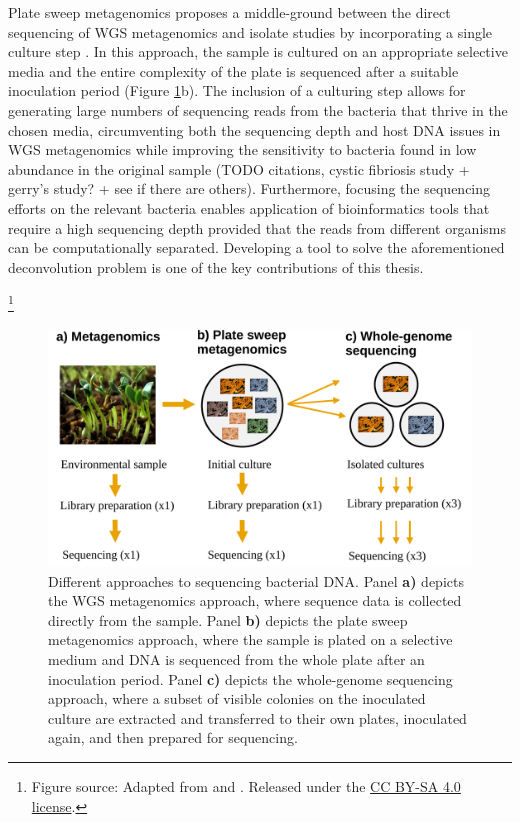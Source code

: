 \documentclass[officiallayout]{tktla}
\let\svthefootnote\thefootnote
\begin{document}
Plate sweep metagenomics proposes a middle-ground between the direct
sequencing of WGS metagenomics and isolate studies by incorporating a
single culture step \citep{maklin_high-resolution_2021}. In this
approach, the sample is cultured on an appropriate selective media and
the entire complexity of the plate is sequenced after a suitable
inoculation period (Figure
\ref{fig:microbiome-sampling-methods}b). The inclusion of a culturing
step allows for generating large numbers of sequencing reads from the
bacteria that thrive in the chosen media, circumventing both the
sequencing depth and host DNA issues in WGS metagenomics while
improving the sensitivity to bacteria found in low abundance in the
original sample (TODO citations, cystic fibriosis study + gerry's
study? + see if there are others). Furthermore, focusing the
sequencing efforts on the relevant bacteria enables application of
bioinformatics tools that require a high sequencing depth provided
that the reads from different organisms can be computationally
separated. Developing a tool to solve the aforementioned deconvolution
problem is one of the key contributions of this thesis.

\noindent\let\thefootnote\relax\footnote{Figure source: Adapted from \cite{praveera_fenugreek-sprouts} and \cite{niaid_escherichia-coli}. Released under the \href{https://creativecommons.org/licenses/by-sa/4.0}{CC BY-SA 4.0 license}.}
\addtocounter{footnote}{-1}\let\thefootnote\svthefootnote
\begin{figure}[!ht]
  \label{fig:microbiome-sampling-methods}
    \centering
    \includegraphics[width=\textwidth,keepaspectratio]{img/sampling/microbiome_sampling_methods.pdf}
    \caption{Different approaches to sequencing bacterial DNA. Panel
      \textbf{a)} depicts the WGS metagenomics approach, where
      sequence data is collected directly from the sample. Panel
      \textbf{b)} depicts the plate sweep metagenomics approach, where
      the sample is plated on a selective medium and DNA is sequenced
      from the whole plate after an inoculation period. Panel
      \textbf{c)} depicts the whole-genome sequencing approach, where
      a subset of visible colonies on the inoculated culture are
      extracted and transferred to their own plates, inoculated again,
      and then prepared for sequencing.}
\end{figure}
\end{document}
